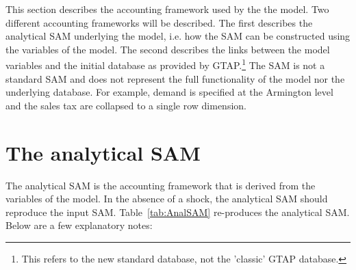 This section describes the accounting framework used by the the model. Two
different accounting frameworks will be described. The first describes the
analytical SAM underlying the model, i.e. how the SAM can be constructed using
the variables of the model. The second describes the links between the model
variables and the initial database as provided by GTAP.\footnote{This refers to
the new standard database, not the 'classic' GTAP database.} The SAM is not a
standard SAM and does not represent the full functionality of the model nor the
underlying database. For example, demand is specified at the Armington level and
the sales tax are collapsed to a single row dimension.

\section{The analytical SAM}

The analytical SAM is the accounting framework that is derived from the
variables of the model. In the absence of a shock, the analytical SAM should
reproduce the input SAM. Table~\ref{tab:AnalSAM} re-produces the analytical SAM.
Below are a few explanatory notes:

